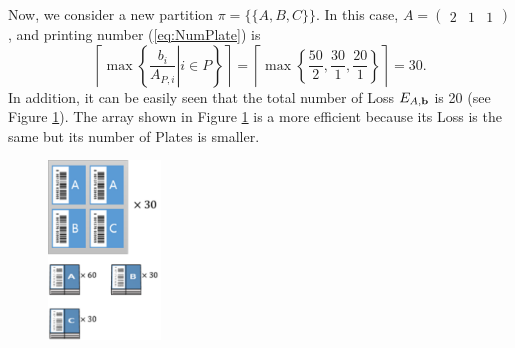 \begin{example}
	Now, we consider a new partition $\pi = \{\{A, B, C\}\}$. In this case, $A = (\begin{array}{ccc}2 & 1 & 1 \end{array})$, and printing number (\ref{eq:NumPlate}) is 
	\begin{equation}
	\left\lceil \max\left\{ \left. \frac{b_{i}}{A_{P,i}} \right| i \in P \right\} \right\rceil = \left\lceil \max \left\{ \frac{50}{2}, \frac{30}{1}, \frac{20}{1} \right\} \right\rceil = 30.
	\end{equation}
	In addition, it can be easily seen that the total number of Loss $E_{A,{\bf b}}$ is 20 (see Figure \ref{fig:ex12}).
	The array shown in Figure \ref{fig:ex12} is a more efficient because its Loss is the same but its number of Plates is smaller.
	\begin{figure}[h!]
		\centering
		\includegraphics[width=3cm]{ex12.pdf}
		\caption{}
		\label{fig:ex12}       %
	\end{figure}
\end{example}

